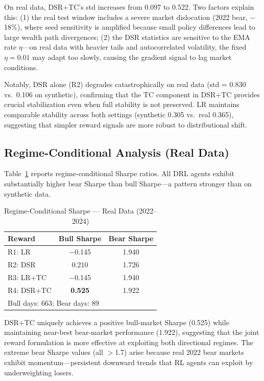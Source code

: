 \documentclass[conference]{IEEEtran}
\begin{document}
On real data, DSR+TC's std increases from 0.097 to 0.522. Two factors
explain this: (1) the real test window includes a severe market dislocation
(2022 bear, $-$18\%), where seed sensitivity is amplified because small
policy differences lead to large wealth path divergences; (2) the DSR
statistics are sensitive to the EMA rate $\eta$—on real data with heavier
tails and autocorrelated volatility, the fixed $\eta=0.01$ may adapt too
slowly, causing the gradient signal to lag market conditions.

Notably, DSR alone (R2) degrades catastrophically on real data
(std = 0.830 vs.\ 0.106 on synthetic), confirming that the TC component
in DSR+TC provides crucial stabilization even when full stability is not
preserved. LR maintains comparable stability across both settings
(synthetic 0.305 vs.\ real 0.365), suggesting that simpler reward signals
are more robust to distributional shift.

\subsection{Regime-Conditional Analysis (Real Data)}

Table~\ref{tab:real_regime} reports regime-conditional Sharpe ratios.
All DRL agents exhibit substantially higher bear Sharpe than bull
Sharpe—a pattern stronger than on synthetic data.

\begin{table}[t]
\caption{Regime-Conditional Sharpe — Real Data (2022--2024)}
\label{tab:real_regime}
\centering
\begin{tabular}{lcc}
\toprule
Reward & Bull Sharpe & Bear Sharpe \\
\midrule
R1: LR         & $-$0.145 & 1.940 \\
R2: DSR        & 0.210    & 1.726 \\
R3: LR+TC      & $-$0.145 & 1.940 \\
R4: DSR+TC     & \textbf{0.525} & 1.922 \\
\midrule
\multicolumn{3}{l}{\small Bull days: 663; Bear days: 89} \\
\bottomrule
\end{tabular}
\end{table}

DSR+TC uniquely achieves a positive bull-market Sharpe (0.525) while
maintaining near-best bear-market performance (1.922), suggesting that
the joint reward formulation is more effective at exploiting both
directional regimes. The extreme bear Sharpe values (all $>$1.7) arise
because real 2022 bear markets exhibit momentum—persistent downward
trends that RL agents can exploit by underweighting losers.
\end{document}
